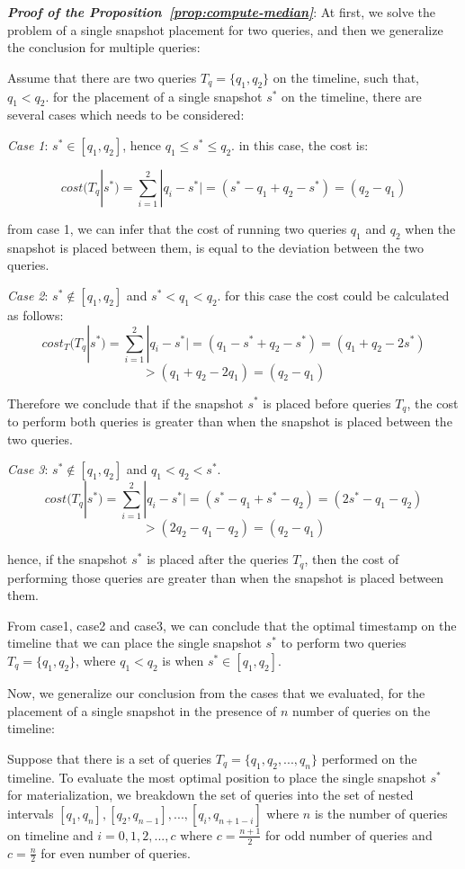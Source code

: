 		\textbf{\emph{Proof of the Proposition~\ref{prop:compute-median}}}:
			At first, we solve the problem of a single snapshot placement for two queries, and then we generalize the conclusion for multiple queries:

			Assume that there are two queries $T_q=\{q_1,q_2 \}$ on the timeline, such that, $q_1<q_2$. for the placement of a single snapshot $s^*$ on the timeline, there are several cases which needs to be considered:

			\emph{Case 1}:
			$s^* \in [q_1,q_2]$, hence $q_1\leq s^*\leq q_2$.
			in this case, the cost is:

			$$cost(T_q|s^*)=\sum_{i=1}^2|q_i-s^*| = (s^*-q_1+q_2-s^*)=(q_2-q_1)$$

			from case 1, we can infer that the cost of running two queries $q_1$ and $q_2$ when the snapshot is placed between them, is equal to the deviation between the two queries.

			\emph{Case 2}:
			$s^* \notin [q_1,q_2]$ and $s^* < q_1 < q_2$. for this case the cost could be calculated as follows:
			$$cost_T(T_q|s^*)=\sum_{i=1}^2|q_i-s^*| = (q_1-s^*+q_2-s^*)=(q_1+q_2-2s^*) $$$$>(q_1+q_2-2q_1)=(q_2-q_1)$$

			Therefore we conclude that if the snapshot $s^*$ is placed before queries $T_q$, the cost to perform both queries is greater than when the snapshot is placed between the two queries.

			\emph{Case 3}:
			$s^* \notin [q_1,q_2]$ and $q_1 < q_2 < s^*$.
			$$cost(T_q|s^*)=\sum_{i=1}^2|q_i-s^*| = (s^*-q_1+s^*-q_2)=(2s^*-q_1-q_2) $$$$>(2q_2-q_1-q_2)=(q_2-q_1)$$

			hence, if the snapshot $s^*$ is placed after the queries $T_q$, then the cost of performing those queries are greater than when the snapshot is placed between them.

			From case1, case2 and case3, we can conclude that the optimal timestamp on the timeline that we can place the single snapshot $s^*$ to perform two queries $T_q = \{q_1,q_2\}$, where $q_1<q_2$ is when $s^* \in [q_1,q_2]$.

			Now, we generalize our conclusion from the cases that we evaluated, for the placement of a single snapshot in the presence of $n$ number of queries on the timeline: 

			Suppose that there is a set of queries $T_q=\{q_1,q_2,...,q_n\}$ performed on the timeline. To evaluate the most optimal position to place the single snapshot $s^*$ for materialization, we breakdown the set of queries into the set of nested intervals $[q_1,q_n],[q_2,q_{n-1}],...,[q_i,q_{n+1-i}]$ where $n$ is the number of queries on timeline and $i=0,1,2,...,c$ where $c=\frac{n+1}{2}$ for odd number of queries and $c=\frac{n}{2}$ for even number of queries.

